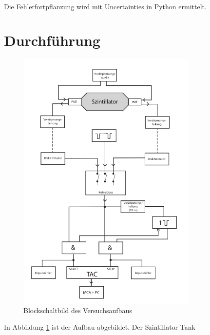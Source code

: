 Die Fehlerfortpflanzung wird mit Uncertainties in Python \cite{uncertainties} ermittelt.


\section{Durchführung}

\begin{figure}
    \centering
    \includegraphics[width=0.8\textwidth]{./Bilder/aufbau.png}
    \caption{Blockschaltbild des Versuchsaufbaus}\label{fig:aufbau}
\end{figure}

In Abbildung \ref{fig:aufbau} ist der Aufbau abgebildet.
Der Szintillator Tank 